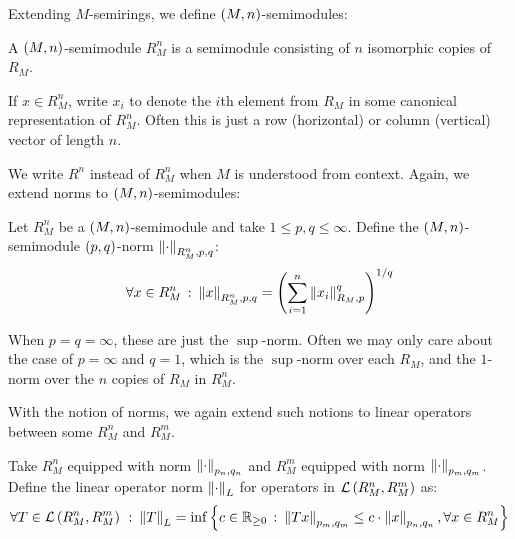 Extending \(M\)-semirings,
we define \(\left(M, n\right)\)-semimodules:

\begin{definition}
  A \(\left(M, n\right)\)-semimodule \(R_M ^n\)
  is a semimodule consisting of \(n\) isomorphic copies of \(R_M\).
\end{definition}

If \(x \in R_M ^n\), write \(x_i\) to denote the \(i\)th element from
\(R_M\) in some canonical representation of \(R_M ^n\).
Often this is just a row (horizontal) or column (vertical)
vector of length \(n\).

We write \(R^n\) instead of \(R_M ^n\) when \(M\) is understood from context.
Again, we extend norms to \(\left(M, n\right)\)-semimodules:

\begin{definition}
  Let \(R_M ^n\) be a \(\left(M, n\right)\)-semimodule
  and take \(1 \leq p, q \leq \infty\).
  Define the \(\left(M, n\right)\)-semimodule \(\left(p, q\right)\)-norm
  \(\left\lVert\cdot\right\rVert_{R_M ^n, p, q}\):
  \begin{align*}
    \forall x \in R_M ^n \ \colon
      \left\lVert x\right\rVert_{R_M ^n, p, q}
        = \left(\sum_{i = 1}^{n} \left\lVert x_i\right\rVert_{R_M, p}^q\right)^{1 / q}
  \end{align*}
\end{definition}

When \(p = q = \infty\), these are just the \(\sup\)-norm.
Often we may only care about the case of \(p = \infty\) and \(q = 1\),
which is the \(\sup\)-norm over each \(R_M\),
and the \(1\)-norm over the \(n\) copies of \(R_M\) in \(R_M ^n\).

With the notion of norms, we again extend such notions to
linear operators between some \(R_M ^n\) and \(R_M ^m\).

\begin{definition}
  Take \(R_M ^n\) equipped with norm \(\left\lVert\cdot\right\rVert_{p_n, q_n}\)
  and \(R_M ^m\) equipped with norm \(\left\lVert\cdot\right\rVert_{p_m, q_m}\).
  Define the linear operator norm \(\left\lVert\cdot\right\rVert_L\)
  for operators in \(\mathcal{L}\left(R_M ^n, R_M ^m\right)\) as:
  \begin{align*}
    \forall T \in \mathcal{L}\left(R_M ^n, R_M ^m\right) \ \colon
      \left\lVert T\right\rVert_L =
        \inf \left\{c \in \mathbb{R}_{\geq 0} \ \colon
                \left\lVert Tx\right\rVert_{p_m, q_m} \leq c \cdot \left\lVert x\right\rVert_{p_n, q_n},
                \forall x \in R_M ^n\right\}
  \end{align*}
\end{definition}


